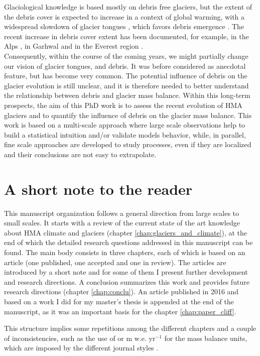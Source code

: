 Glaciological knowledge is based mostly on debris free glaciers, but the extent of the debris cover is expected to increase in a context of global warming, with a widespread slowdown of glacier tongues \citep{heid_repeat_2012}, which favors debris emergence \citep{kirkbride_formation_2013,anderson_modeling_2016,rowan_modelling_2015,wirbel_modelling_2018}. The recent increase in debris cover extent has been documented, for example, in the Alps \citep[e.g.,][]{deline_change_2005,gardent_multitemporal_2014}, in Garhwal \citep[e.g.,][]{bhambri_glacier_2011} and in the Everest region \citep[e.g.,][]{thakuri_tracing_2014}.\\



Consequently, within the course of the coming years, we might partially change our vision of glacier tongues, and debris. It was before considered as anecdotal feature, but has become very common. The potential influence of debris on the glacier evolution is still unclear, and it is therefore needed to better understand the relationship between debris and glacier mass balance. Within this long-term prospects, the aim of this PhD work is to assess the recent evolution of HMA glaciers and to quantify the influence of debris on the glacier mass balance. This work is based on a multi-scale approach where large scale observations help to build a statistical intuition and/or validate models behavior, while, in parallel, fine scale approaches are developed to study processes, even if they are localized and their conclusions are not easy to extrapolate.

\section*{A short note to the reader}
This manuscript organization follows a general direction from large scales to small scales. It starts with a review of the current state of the art knowledge about HMA climate and glaciers (chapter \ref{chap:glaciers_and_climate}), at the end of which the detailed research questions addressed in this manuscript can be found. The main body consists in three chapters, each of which is based on an article (one published, one accepted and one in review). The articles are introduced by a short note and for some of them I present further development and research directions. A conclusion summarizes this work and provides future research directions (chapter \ref{chap:conclu}). An article published in 2016 and based on a work I did for my master's thesis is appended at the end of the manuscript, as it was an important basis for the chapter \ref{chap:paper_cliff}.

This structure implies some repetitions among the different chapters and a couple of inconsistencies, such as the use of \mwe or m w.e. yr$^{-1}$ for the mass balance units, which are imposed by the different journal styles \citep[both in compliance with][]{cogley_glossary_2011}.